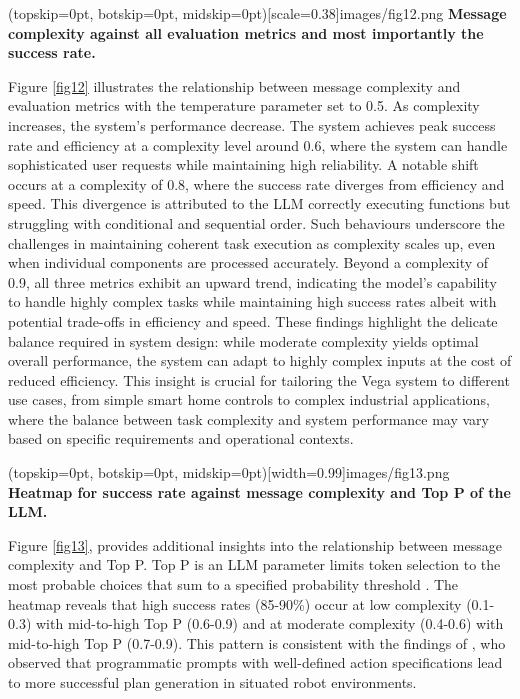 \documentclass{ieeeaccess}
\begin{document}
\Figure[t!](topskip=0pt, botskip=0pt,
midskip=0pt)[scale=0.38]{{images/fig12.png}}
{ \textbf{Message complexity against all evaluation metrics and most importantly the success rate.}\label{fig12}}

Figure \ref{fig12} illustrates the relationship between message complexity and evaluation metrics with the temperature parameter set to 0.5. As complexity increases, the system's performance decrease. The system achieves peak success rate and efficiency at a complexity level around 0.6, where the system can handle sophisticated user requests while maintaining high reliability. A notable shift occurs at a complexity of 0.8, where the success rate diverges from efficiency and speed. This divergence is attributed to the LLM correctly executing functions but struggling with conditional and sequential order. Such behaviours underscore the challenges in maintaining coherent task execution as complexity scales up, even when individual components are processed accurately. Beyond a complexity of 0.9, all three metrics exhibit an upward trend, indicating the model's capability to handle highly complex tasks while maintaining high success rates albeit with potential trade-offs in efficiency and speed. These findings highlight the delicate balance required in system design: while moderate complexity yields optimal overall performance, the system can adapt to highly complex inputs at the cost of reduced efficiency. This insight is crucial for tailoring the Vega system to different use cases, from simple smart home controls to complex industrial applications, where the balance between task complexity and system performance may vary based on specific requirements and operational contexts. 

\Figure[h!](topskip=0pt, botskip=0pt,
midskip=0pt)[width=0.99\columnwidth]{{images/fig13.png}}
{ \textbf{Heatmap for success rate against message complexity and Top P of the LLM.}\label{fig13}}

Figure \ref{fig13}, provides additional insights into the relationship between message complexity and Top P. Top P is an LLM parameter limits token selection to the most probable choices that sum to a specified probability threshold \cite{rum2024setting}. The heatmap reveals that high success rates (85-90\%) occur at low complexity (0.1-0.3) with mid-to-high Top P (0.6-0.9) and at moderate complexity (0.4-0.6) with mid-to-high Top P (0.7-0.9). This pattern is consistent with the findings of \citet{Singh2023}, who observed that programmatic prompts with well-defined action specifications lead to more successful plan generation in situated robot environments.
\end{document}
